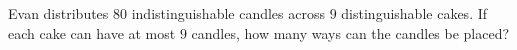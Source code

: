 Evan distributes $80$ indistinguishable candles across $9$ distinguishable cakes. If each cake can have at most $9$ candles, how many ways can the candles be placed?
